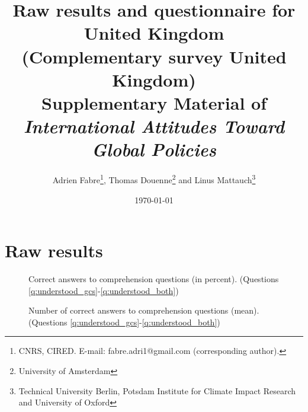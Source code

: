 \documentclass[12pt,english]{article}
\title{Raw results and questionnaire for United Kingdom \\
(Complementary survey United Kingdom) \\ 
Supplementary Material of \\
\textit{International Attitudes Toward Global Policies}
}
\author{Adrien Fabre\footnote{CNRS, CIRED. E-mail: fabre.adri1@gmail.com (corresponding author).}, Thomas Douenne\footnote{University of Amsterdam}\; and Linus Mattauch\footnote{Technical University Berlin, Potsdam Institute for Climate Impact Research and University of Oxford}} %
\date{\today} %
\begin{document}
\maketitle

\tableofcontents

\clearpage
\listoffigures


\clearpage
\section{Raw results}\label{app:raw_results_UK}

\begin{figure}[h!]
    \caption[Comprehension]{Correct answers to comprehension questions (in percent). (Questions \ref{q:understood_gcs}-\ref{q:understood_both})}\label{fig:understood_each}
\end{figure}

\begin{figure}[h!]
    \caption[Comprehension score]{Number of correct answers to comprehension questions (mean). (Questions \ref{q:understood_gcs}-\ref{q:understood_both})}\label{fig:understood_score}
\end{figure}
\end{document}
